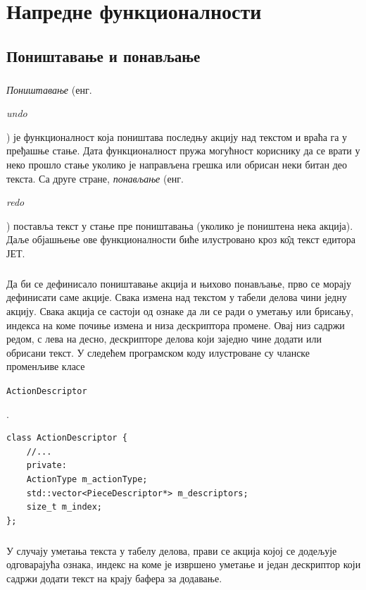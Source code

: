 \documentclass[12pt,oneside]{memoir}
\begin{document}
\chapter{Напредне функционалности}
\section{Поништавање и понављање}
\paragraph{}
\emph{Поништавање} (енг. \begin{latinica}\textit{undo}\end{latinica}) је функционалност која поништава последњу акцију над текстом и враћа га у пређашње стање. Дата функционалност пружа могућност кориснику да се врати у неко прошло 
стање уколико је направљена грешка или обрисан неки битан део текста. Са друге
стране, \emph{понављање} (енг. \begin{latinica}\textit{redo}\end{latinica})
поставља текст у стање пре поништавања (уколико је поништена нека акција).
Даље објашњење ове функционалности биће илустровано кроз к\^{о}д текст едитора 
ЈЕТ.

\paragraph{}
Да би се дефинисало поништавање акција и њихово понављање, прво се морају дефинисати саме акције. Свака измена над текстом у табели делова чини једну
акцију. Свака акција се састоји од ознаке да ли се ради о уметању или брисању,
индекса
на коме почиње измена и низа дескриптора промене. Овај низ садржи редом, 
с лева  на десно, дескрипторе делова који заједно чине додати или обрисани текст.
У следећем програмском коду илустроване су чланске променљиве класе 
\begin{latinica}\verb|ActionDescriptor|\end{latinica}.

\begin{verbatim}
class ActionDescriptor {
	//...
	private:
	ActionType m_actionType;
	std::vector<PieceDescriptor*> m_descriptors;
	size_t m_index;
};
\end{verbatim}


\paragraph{}
У случају уметања текста у табелу делова, прави се акција којој
се додељује одговарајућа ознака, индекс на коме је извршено уметање и
један дескриптор који садржи додати текст на крају бафера за додавање.
\end{document}
